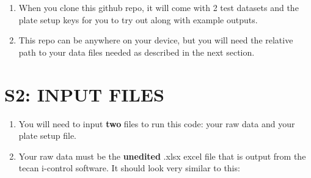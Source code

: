 \documentclass[12pt]{article}
\begin{document}
\begin{enumerate}
\item When you clone this github repo, it will come with 2 test datasets and the plate setup keys for you to try out along with example outputs.

\item This repo can be anywhere on your device, but you will need the relative path to your data files needed as described in the next section.
\end{enumerate}

\section*{S2: INPUT FILES}
\label{sec:orged18135}
\begin{enumerate}
\item You will need to input \textbf{two} files to run this code: your raw data
and your plate setup file.

\item Your raw data must be the \textbf{unedited} .xlsx excel file that is output
from the tecan i-control software. It should look very similar to
this:


\end{enumerate}
\end{document}
